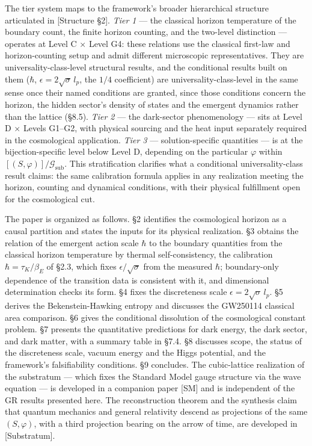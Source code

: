 \documentclass[
]{article}
\begin{document}
The tier system maps to the framework's broader hierarchical structure
articulated in {[}Structure §2{]}. \emph{Tier 1} --- the classical
horizon temperature of the boundary count, the finite horizon counting,
and the two-level distinction --- operates at Level C × Level G4: these
relations use the classical first-law and horizon-counting setup and
admit different microscopic representatives. They are
universality-class-level structural results, and the conditional results
built on them (\(\hbar\), \(\epsilon = 2\sqrt{\sigma}\,l_p\), the
\(1/4\) coefficient) are universality-class-level in the same sense once
their named conditions are granted, since those conditions concern the
horizon, the hidden sector's density of states and the emergent dynamics
rather than the lattice (§8.5). \emph{Tier 2} --- the dark-sector
phenomenology --- sits at Level D × Levels G1--G2, with physical
sourcing and the heat input separately required in the cosmological
application. \emph{Tier 3} --- solution-specific quantities --- is at
the bijection-specific level below Level D, depending on the particular
\(\varphi\) within \([(S, \varphi)]/\mathcal{G}_{\text{sub}}\). This
stratification clarifies what a conditional universality-class result
claims: the same calibration formula applies in any realization meeting
the horizon, counting and dynamical conditions, with their physical
fulfillment open for the cosmological cut.

The paper is organized as follows. §2 identifies the cosmological
horizon as a causal partition and states the inputs for its physical
realization. §3 obtains the relation of the emergent action scale
\(\hbar\) to the boundary quantities from the classical horizon
temperature by thermal self-consistency, the calibration
\(\hbar=\tau_K/\beta_E\) of §2.3, which fixes \(\epsilon/\sqrt{\sigma}\)
from the measured \(\hbar\); boundary-only dependence of the transition
data is consistent with it, and dimensional determination checks its
form. §4 fixes the discreteness scale
\(\epsilon = 2\sqrt{\sigma}\,l_p\). §5 derives the Bekenstein-Hawking
entropy and discusses the GW250114 classical area comparison. §6 gives
the conditional dissolution of the cosmological constant problem. §7
presents the quantitative predictions for dark energy, the dark sector,
and dark matter, with a summary table in §7.4. §8 discusses scope, the
status of the discreteness scale, vacuum energy and the Higgs potential,
and the framework's falsifiability conditions. §9 concludes. The
cubic-lattice realization of the substratum --- which fixes the Standard
Model gauge structure via the wave equation --- is developed in a
companion paper {[}SM{]} and is independent of the GR results presented
here. The reconstruction theorem and the synthesis claim that quantum
mechanics and general relativity descend as projections of the same
\((S, \varphi)\), with a third projection bearing on the arrow of time,
are developed in {[}Substratum{]}.
\end{document}
